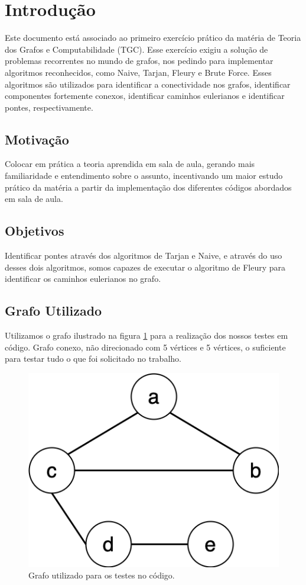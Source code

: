 
\section{Introdução}
Este documento está associado ao primeiro exercício prático da matéria de Teoria dos Grafos e Computabilidade (TGC). Esse exercício exigiu a solução de problemas recorrentes no mundo de grafos, nos pedindo para implementar algoritmos reconhecidos, como Naive, Tarjan, Fleury e Brute Force. Esses algoritmos são utilizados para identificar a conectividade nos grafos, identificar componentes fortemente conexos, identificar caminhos eulerianos e identificar pontes, respectivamente.



\subsection{Motivação}
Colocar em prática a teoria aprendida em sala de aula, gerando mais familiaridade e entendimento sobre o assunto, incentivando um maior estudo prático da matéria a partir da implementação dos diferentes códigos abordados em sala de aula.
\subsection{Objetivos}
Identificar pontes através dos algoritmos de Tarjan e Naive, e através do uso desses dois algoritmos, somos capazes de executar o algoritmo de Fleury para identificar os caminhos eulerianos no grafo.
\subsection{Grafo Utilizado}
Utilizamos o grafo ilustrado na figura \ref{fig:grafo} para a realização dos nossos testes em código. Grafo conexo, não direcionado com 5 vértices e 5 vértices, o suficiente para testar tudo o que foi solicitado no trabalho.
\begin{figure}[H]
	\centering	
    \includegraphics[width=.50\linewidth]{Figuras/Graph.png}
    \caption{Grafo utilizado para os testes no código.}
    \label{fig:grafo}
\end{figure}



